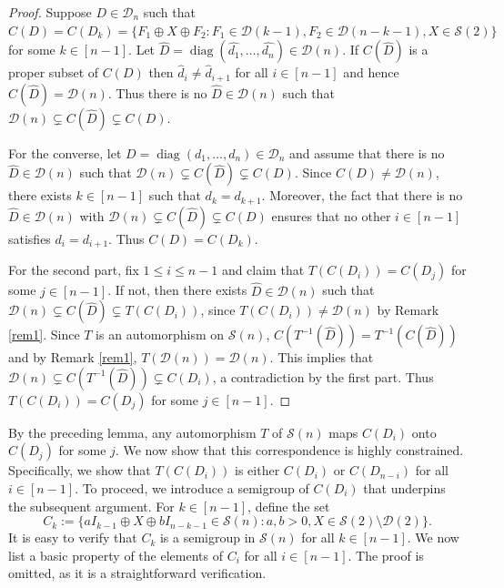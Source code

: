 \documentclass[11pt,reqno]{amsart}
\theoremstyle{plain}
\theoremstyle{definition}
\numberwithin{equation}{section}
\DeclareMathOperator{\diag}{diag}
\def\cS{\mathcal S}
\def\cD{\mathcal D}
\begin{document}
\begin{proof}
	Suppose $D \in \cD_n$ such that $C(D) = C(D_k)= \{F_1 \oplus X \oplus F_2: 
	F_1\in \cD(k-1), F_2\in \cD(n-k-1), X \in \cS(2)\}$ for some $k \in [n-1]$.  Let $\hat D=\diag( \hat{d_1},\ldots, \hat{d_n}) \in \cD(n)$. If $C(\hat D)$  is a proper subset of $C(D)$ then $\hat{d}_i\neq \hat{d}_{i+1}$ for all $i \in [n-1]$ and hence $C(\hat D)= \cD(n)$. Thus  there is no $\hat D \in \cD(n)$ such that $\cD(n) \subsetneq C(\hat D) \subsetneq C(D)$.
	
	For the converse, let $D=\diag(d_1,\ldots,d_n) \in \cD_n$  and assume that  there is no $\hat D \in \cD(n)$ such that 
	$\cD(n) \subsetneq C(\hat D) \subsetneq C(D)$.  Since $C(D)\neq \cD(n)$, there exists 
	$k \in [n-1]$ such that $d_k=d_{k+1}$. Moreover, the fact that there is no $\hat D \in \cD(n)$ with
	$\cD(n) \subsetneq C(\hat D) \subsetneq C(D)$ ensures that no other $i \in [n-1]$ satisfies $d_i=d_{i+1}$. Thus  $C(D) = C(D_k)$. 
	
	
	For the second part, fix $1\leq i\leq n-1$ and  claim that  $T(C(D_i)) = C(D_j)$ for some $j \in[n-1]$.  If not, then there exists $\hat D \in \cD(n)$ such that $\cD(n) \subsetneq C(\hat D) \subsetneq T(C(D_i))$, since $T(C(D_i))\neq \cD(n)$ by Remark \ref{rem1}. Since $T$ is an automorphism on $\cS(n)$, $C\left(T^{-1}(\hat D)\right)=T^{-1}(C(\hat D))$ and by Remark \ref{rem1}, $T(\cD(n)) =  \cD(n)$. This implies that $\cD(n) \subsetneq C\left(T^{-1}(\hat D)\right)  \subsetneq C(D_i)$, a contradiction by the first part. Thus  $T(C(D_i)) = C(D_j)$ for some  $j \in [n-1]$.
\end{proof}

By the preceding lemma, any automorphism $T$ of $\cS(n)$ maps $C(D_i)$ onto  $C(D_j)$ for some $j$. We now show that this correspondence is highly constrained. Specifically, we show that $T(C(D_i))$ is either $C(D_i)$ or $C(D_{n-i})$ for all $i \in [n-1]$. To proceed, we introduce a semigroup of  $C(D_i)$ that underpins the subsequent argument.  For $k\in [n-1]$, define the set
\begin{equation}\label{sgrpC_k}
	C_k:=\{aI_{k-1} \oplus X \oplus bI_{n-k-1} \in \cS(n): a,b > 0,  X \in \cS(2)\setminus\cD(2)\}.\end{equation}
It is easy to verify that $C_k$ is a semigroup in $\cS(n)$ for all $k\in[n-1]$. We now list a basic property of the elements of $C_i$ for all $i\in[n-1]$. The proof is omitted, as it is a straightforward verification.
\end{document}
